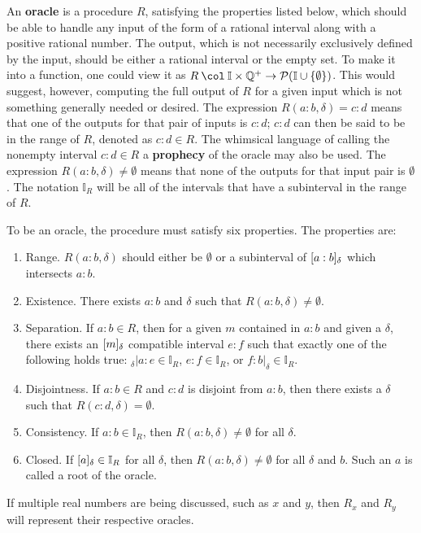 \documentclass[12pt]{article}
\begin{document}
An \textbf{oracle} is a procedure $R$, satisfying the properties listed below, which should be able to handle any input of the form of a rational interval along with a positive rational number. The output, which is not necessarily exclusively defined by the input, should be either a rational interval or the empty set. To make it into a function, one could view it as $R \mathbin{\col} \mathbb{I} \times \mathbb{Q}^+ \to \mathcal{P}(\mathbb{I} \cup \{\emptyset\})$. This would suggest, however, computing the full output of $R$ for a given input which is not something generally needed or desired. The expression $R(a:b, \delta) = c:d$ means that one of the outputs for that pair of inputs is $c:d$; $c:d$ can then be said to be in the range of $R$, denoted as $c:d \in R$. The whimsical language of calling the nonempty interval $c:d \in R$ a \textbf{prophecy} of the oracle may also be used. The expression $R(a:b, \delta) \neq \emptyset$ means that none of the outputs for that input pair is $\emptyset$. The notation $\mathbb{I}_R$ will be all of the intervals that have a subinterval in the range of $R$. 

To be an oracle, the procedure must satisfy six properties.  The properties are:
\begin{enumerate}
    \item Range. 
    $R(a:b, \delta)$ should either be $\emptyset$ or a subinterval of $[a:b]_{\delta}$ which intersects $a:b$. 
    \item Existence. 
    There exists $a:b$ and $\delta$ such that $R(a:b, \delta) \neq \emptyset$.
    \item Separation. 
    If $a:b \in R$, then for a given $m$ contained in $a:b$ and given a $\delta$, there exists an $[m]_{\delta}$ compatible interval $e:f$ such that exactly one of the following holds true:  ${}_\delta |a:e \in \mathbb{I}_R$, $e:f \in \mathbb{I}_R$,  or $f:b|_\delta \in \mathbb{I}_R$.
   \item Disjointness. 
   If $a:b \in R$ and $c:d$ is disjoint from $a:b$, then there exists a $\delta$ such that $R(c:d, \delta) = \emptyset$.
    \item Consistency. 
    If $a:b  \in \mathbb{I}_R$, then $R(a:b, \delta) \neq \emptyset$ for all $\delta$.
    \item Closed. 
    If $[a]_{\delta} \in \mathbb{I}_R$ for all $\delta $, then $R(a:b, \delta) \neq \emptyset$ for all $\delta$ and $b$. Such an $a$ is called a root of the oracle. 
\end{enumerate}

If multiple real numbers are being discussed, such as $x$ and $y$, then $R_x$ and $R_y$ will represent their respective oracles. 
\end{document}

